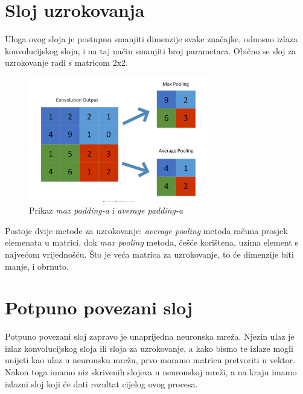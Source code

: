 \section{Sloj uzrokovanja}\label{sec:sloj-uzrokovanja}
Uloga ovog sloja je postupno smanjiti dimenzije svake značajke, odnosno izlaza konvolucijskog sloja, i na taj način smanjiti broj parametara.
Obično se sloj za uzrokovanje radi s matricom 2x2.

\FloatBarrier
\begin{figure}[h]
    \centering
    \includegraphics[width=0.7\textwidth]{images/Pooling}
    \caption{Prikaz \emph{max padding-a} i \emph{average padding-a}
    \protect\footnotemark}
    \label{fig:slika16}
\end{figure}
\FloatBarrier
{}


Postoje dvije metode za uzrokovanje: \emph{average pooling} metoda računa prosjek elemenata u matrici, dok \emph{max pooling} metoda, češće korištena, uzima element s najvećom vrijednošću.
Što je veća matrica za uzrokovanje, to će dimenzije biti manje, i obrnuto.

\section{Potpuno povezani sloj}\label{sec:potpuno-povezani-sloj}
Potpuno povezani sloj zapravo je unaprijedna neuronska mreža.
Njezin ulaz je izlaz konvolucijskog sloja ili sloja za uzrokovanje, a kako bismo te izlaze mogli unijeti kao ulaz u neuronsku mrežu, prvo moramo matricu pretvoriti u vektor.
Nakon toga imamo niz skrivenih slojeva u neuronskoj mreži, a na kraju imamo izlazni sloj koji će dati rezultat cijelog ovog procesa.